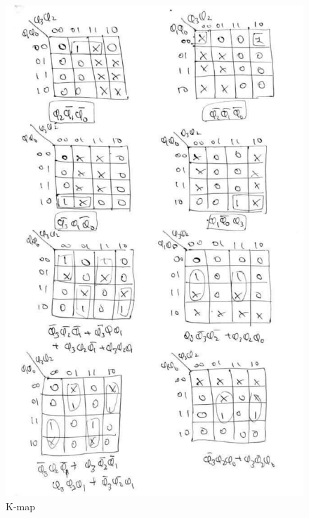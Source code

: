 \documentclass[12pt]{article}
\begin{document}
    \begin{figure}
        \centering
        \includegraphics[width=\linewidth]{K-map.png}
        \caption{K-map}
        \label{fig:enter-label}
    \end{figure}
\end{document}
